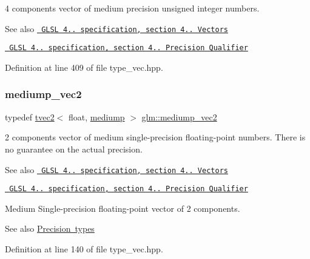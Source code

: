 4 components vector of medium precision unsigned integer numbers.

\begin{DoxySeeAlso}{See also}
\href{http://www.opengl.org/registry/doc/GLSLangSpec.4.20.8.pdf}{\texttt{ G\+L\+SL 4.. specification, section 4.. Vectors}} 

\href{http://www.opengl.org/registry/doc/GLSLangSpec.4.20.8.pdf}{\texttt{ G\+L\+SL 4.. specification, section 4.. Precision Qualifier}} 
\end{DoxySeeAlso}


Definition at line 409 of file type\+\_\+vec.\+hpp.

\mbox{\label{group__core__precision_ga949639029259b8bf5c4bc96bd2cc5a59}} 
\subsubsection{\texorpdfstring{mediump\_vec2}{mediump\_vec2}}
{\footnotesize\ttfamily typedef \mbox{\hyperlink{structglm_1_1tvec2}{tvec2}}$<$ float, \mbox{\hyperlink{namespaceglm_a0f04f086094c747d227af4425893f545a6416f3ea0c9025fb21ed50c4d6620482}{mediump}} $>$ \mbox{\hyperlink{group__core__precision_ga949639029259b8bf5c4bc96bd2cc5a59}{glm\+::mediump\+\_\+vec2}}}

2 components vector of medium single-\/precision floating-\/point numbers. There is no guarantee on the actual precision.

\begin{DoxySeeAlso}{See also}
\href{http://www.opengl.org/registry/doc/GLSLangSpec.4.20.8.pdf}{\texttt{ G\+L\+SL 4.. specification, section 4.. Vectors}} 

\href{http://www.opengl.org/registry/doc/GLSLangSpec.4.20.8.pdf}{\texttt{ G\+L\+SL 4.. specification, section 4.. Precision Qualifier}}
\end{DoxySeeAlso}
Medium Single-\/precision floating-\/point vector of 2 components. \begin{DoxySeeAlso}{See also}
\mbox{\hyperlink{group__core__precision}{Precision types}} 
\end{DoxySeeAlso}


Definition at line 140 of file type\+\_\+vec.\+hpp.

\mbox{\label{group__core__precision_gac76bf24aca62ca13269d262121d04ceb}} 

